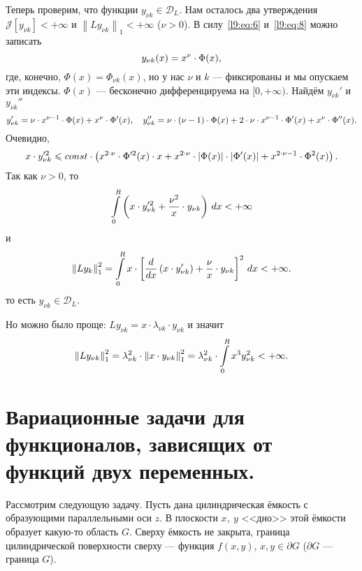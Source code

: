 \documentclass[12pt,a4paper,openany,fleqn]{book}
\newcommand{\J}{\ensuremath{\mathcal{J}}}
\newcommand{\mc}[1]{\ensuremath{\mathcal{#1}}}
\newcommand{\der}[2]{\ensuremath{\frac{d#1}{d#2}}}
\newcommand{\norm}[1]{\ensuremath{\left\|#1\right\|}}
\theoremstyle{definition}
\begin{document}
	Теперь проверим, что функции $y_{\nu k}\in\mc{D}_L$. Нам осталось два утверждения $\J[y_{\nu k}]<+\infty$ и $\norm{Ly_{\nu k}}_1<+\infty$ ($\nu>0$). В силу~\eqref{l9:eq:6} и~\eqref{l9:eq:8} можно записать
	\begin{equation*}
		\hfill y_{\nu k}(x)=x^{\nu}\cdot\Phi(x),\hfill 
	\end{equation*}
	где, конечно, $\Phi(x)=\Phi_{\nu k}(x)$, но у нас $\nu$ и $k$ --- фиксированы и мы опускаем эти индексы. $\Phi(x)$ --- бесконечно дифференцируема на $[0,+\infty)$. Найдём $y_{\nu k}'$ и $y_{\nu k}''$
	\begin{equation*}
		\hfill y_{\nu k}'=\nu\cdot x^{\nu-1}\cdot\Phi(x)+x^{\nu}\cdot\Phi'(x),\quad y_{\nu k}''=\nu\cdot(\nu-1)\cdot\Phi(x)+2\cdot\nu\cdot x^{\nu-1}\cdot\Phi'(x)+x^{\nu}\cdot\Phi''(x).\hfill
	\end{equation*}
	Очевидно,
	\begin{equation*}
		\hfill x\cdot y_{\nu k}^{\prime2}\leqslant const\cdot\left(x^{2\cdot\nu}\cdot\Phi^{\prime2}(x)\cdot x+x^{2\cdot\nu}\cdot|\Phi(x)|\cdot|\Phi'(x)|+x^{2\cdot\nu-1}\cdot\Phi^2(x)\right).\hfill
	\end{equation*}
	Так как $\nu>0$, то
	\begin{equation*}
		\hfill\int\limits_0^R\left(x\cdot y_{\nu k}^{\prime2}+\frac{\nu^2}{x}\cdot y_{\nu k}\right)\,dx<+\infty\hfill
	\end{equation*}
	и 
	\begin{equation*}
		\hfill\norm{Ly_k}_1^2=\int\limits_0^R x\cdot\left[\der{}{x}\left(x\cdot y_{\nu k}'\right)+\frac{\nu}{x}\cdot y_{\nu k}\right]^2\,dx<+\infty.\hfill
	\end{equation*}
	то есть $y_{\nu k}\in\mc{D}_L$. 
	
	Но можно было проще: $Ly_{\nu k}=x\cdot\lambda_{\nu k}\cdot y_{\nu k}$ и значит
	\begin{equation*}
		\hfill\norm{Ly_{\nu k}}_1^2=\lambda_{\nu k}^2\cdot\norm{x\cdot y_{\nu k}}_1^2=\lambda_{\nu k}^2\cdot\int\limits_0^R x^3 y_{\nu k}^2<+\infty.\hfill
	\end{equation*} 
	\section[Функционалы, зависящие от функций двух переменных.]{Вариационные задачи для функционалов, зависящих от функций двух переменных.}
	\label{lecture9section2}
	Рассмотрим следующую задачу. Пусть дана цилиндрическая ёмкость с образующими параллельными оси $z$. В плоскости $x,\ y$ <<дно>> этой ёмкости образует какую-то область $G$. Сверху ёмкость не закрыта, граница цилиндрической поверхности сверху --- функция $f(x,y)$, $x,y\in\partial G$ ($\partial G$ --- граница $G$).
	
\end{document}
